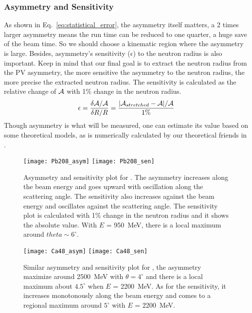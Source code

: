 \subsubsection{Asymmetry and Sensitivity}
As shown in Eq.~\ref{eq:statistical_error}, the asymmetry itself matters,
a 2 times larger asymmetry means the run time can be reduced to one quarter,
a huge save of the beam time. So we should choose a kinematic region where
the asymmetry is large. Besides, asymmetry's sensitivity ($\epsilon$) to the neutron radius 
is also important. Keep in mind that our final goal is to extract the neutron radius
from the PV asymmetry, the more sensitive the asymmetry to the neutron radius, the
more precise the extracted neutron radius. The sensitivity is calculated
as the relative change of $\mathcal{A}$ with 1\% change in the neutron radius.
\begin{equation}
    \epsilon = \frac{\delta \mathcal{A}/\mathcal{A}}{\delta R/R} = \frac{|\mathcal{A}_{stretched} - \mathcal{A}|/\mathcal{A}}{1\%}
\end{equation}
Though asymmetry is what will be measured, one can estimate its value based
on some theoretical models, as is numerically calculated by our theoretical 
friends in \cite{PhysRevC.57.3430}.
\begin{figure}[!h]
    \texttt{[image: Pb208\_asym]}
    \texttt{[image: Pb208\_sen]}
    \caption{Asymmetry and sensitivity plot for \Pb. The asymmetry increases along 
    the beam energy and goes upward with oscillation along the scattering angle. 
    The sensitivity also increases against the beam energy and oscillates against
    the scattering angle.  The sensitivity plot is calculated with 1\% change in 
    the neutron radius and it shows the absolute value.
    With $E$ = 950~MeV, there is a local maximum around $theta \sim 6^\circ$.
    }
\end{figure}
\begin{figure}[!h]
    \texttt{[image: Ca48\_asym]}
    \texttt{[image: Ca48\_sen]}
    \caption{Similar asymmetry and sensitivity plot for \Ca, the asymmetry maximize 
    around 2500~MeV with $\theta = 4^\circ$ and there is a local maximum 
    about $4.5^\circ$ when $E$ = 2200~MeV. As for the sensitivity, it increases
    monotonously along the beam energy and comes to a regional maximum around $5^\circ$
    with $E$ = 2200~MeV.
    }
    \label{fig:ca48_asym_sen}
\end{figure}

